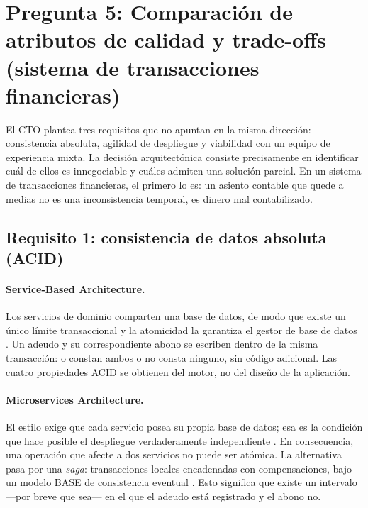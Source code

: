 \section[Pregunta 5: Atributos de calidad y trade-offs]{Pregunta 5: Comparación de atributos de calidad y trade-offs\\(sistema de transacciones financieras)}


El CTO plantea tres requisitos que no apuntan en la misma dirección: consistencia absoluta, agilidad de despliegue y viabilidad con un equipo de experiencia mixta. La decisión arquitectónica consiste precisamente en identificar cuál de ellos es innegociable y cuáles admiten una solución parcial. En un sistema de transacciones financieras, el primero lo es: un asiento contable que quede a medias no es una inconsistencia temporal, es dinero mal contabilizado.

\subsection{Requisito 1: consistencia de datos absoluta (ACID)}

\paragraph{Service-Based Architecture.} Los servicios de dominio comparten una base de datos, de modo que existe un único límite transaccional y la atomicidad la garantiza el gestor de base de datos \parencite{richardsford2020}. Un adeudo y su correspondiente abono se escriben dentro de la misma transacción: o constan ambos o no consta ninguno, sin código adicional. Las cuatro propiedades ACID se obtienen del motor, no del diseño de la aplicación.

\paragraph{Microservices Architecture.} El estilo exige que cada servicio posea su propia base de datos; esa es la condición que hace posible el despliegue verdaderamente independiente \parencite{richardsford2020}. En consecuencia, una operación que afecte a dos servicios no puede ser atómica. La alternativa pasa por una \emph{saga}: transacciones locales encadenadas con compensaciones, bajo un modelo BASE de consistencia eventual \parencite{fordhardparts2021}. Esto significa que existe un intervalo ---por breve que sea--- en el que el adeudo está registrado y el abono no.

